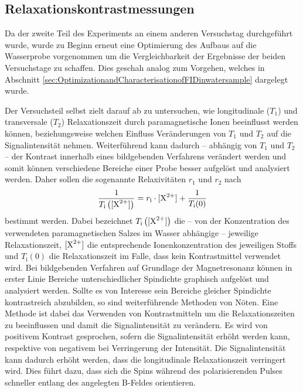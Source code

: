 \subsection{Relaxationskontrastmessungen}
\label{sec:Signalintensitaet}
Da der zweite Teil des Experiments an einem anderen Versuchstag durchgeführt wurde, wurde zu Beginn erneut eine Optimierung des Aufbaus auf die Wasserprobe vorgenommen um die Vergleichbarkeit der Ergebnisse der beiden Versuchstage zu schaffen. Dies geschah analog zum Vorgehen, welches in Abschnitt \ref{sec:OptimizationandCharacterisationofFIDinwatersample} dargelegt wurde.

Der Versuchsteil selbst zielt darauf ab zu untersuchen, wie longitudinale ($T_1$) und transversale ($T_2$) Relaxationszeit durch paramagnetische Ionen beeinflusst werden können, beziehungsweise welchen Einfluss Veränderungen von $T_1$ und $T_2$ auf die Signalintensität nehmen.
Weiterführend kann dadurch -- abhängig von $T_1$ und $T_2$ -- der Kontrast innerhalb eines bildgebenden Verfahrens verändert werden und somit können verschiedene Bereiche einer Probe besser aufgelöst und analysiert werden. 
Daher sollen die sogenannte Relaxivitäten $r_1$ und $r_2$ nach
\begin{align}
    \frac{1}{T_{\text{i}}\left([\ce{X^2+}]\right)} = r_{\text{i}} \cdot [\ce{X^2+}] + \frac{1}{T_{\text{i}}(0)} \label{eq:relaxivitat}
\end{align}
bestimmt werden. Dabei bezeichnet $T_{\text{i}}\left([\ce{X^2+}]\right)$ die -- von der Konzentration des verwendeten paramagnetischen Salzes im Wasser abhängige -- jeweilige Relaxationszeit, $[\ce{X^2+}]$  die entsprechende Ionenkonzentration des jeweiligen Stoffs und $T_{\text{i}}(0)$ die Relaxationszeit im Falle, dass kein Kontrastmittel verwendet wird.\newline
Bei bildgebenden Verfahren auf Grundlage der Magnetresonanz können in erster Linie Bereiche unterschiedlicher Spindichte graphisch aufgelöst und analysiert werden.
Sollte es von Interesse sein Bereiche gleicher Spindichte kontrastreich abzubilden, so sind weiterführende Methoden von Nöten.
Eine Methode ist dabei das Verwenden von Kontrastmitteln um die Relaxationszeiten zu beeinflussen und damit die Signalintensität zu verändern.
Es wird von positivem Kontrast gesprochen, sofern die Signalintensität erhöht werden kann, respektive von negativem bei Verringerung der Intensität. 
Die Signalintensität kann dadurch erhöht werden, dass die longitudinale Relaxationszeit verringert wird.
Dies führt dazu, dass sich die Spins während des polarisierenden Pulses schneller entlang des angelegten B-Feldes orientieren.

